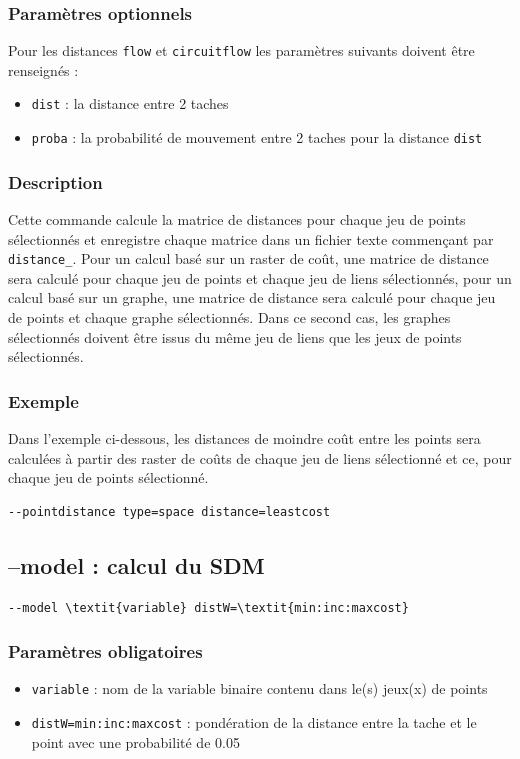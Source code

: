 \documentclass[a4paper,10pt]{report}
\begin{document}
\subsubsection{Paramètres optionnels}
Pour les distances \verb|flow| et \verb|circuitflow| les paramètres suivants doivent être renseignés :
\begin{itemize}
	\item \verb|dist| : la distance entre 2 taches
	\item \verb|proba| : la probabilité de mouvement entre 2 taches pour la distance \verb|dist|
\end{itemize}

\subsubsection{Description}
Cette commande calcule la matrice de distances pour chaque jeu de points sélectionnés et enregistre chaque matrice dans un fichier texte commençant par \verb|distance_|.
Pour un calcul basé sur un raster de coût, une matrice de distance sera calculé pour chaque jeu de points et chaque jeu de liens sélectionnés, pour un calcul basé sur un graphe, une matrice de distance sera calculé pour chaque jeu de points et chaque graphe sélectionnés. Dans ce second cas, les graphes sélectionnés doivent être issus du même jeu de liens que les jeux de points sélectionnés.

\subsubsection{Exemple}
Dans l'exemple ci-dessous, les distances de moindre coût entre les points sera calculées à partir des raster de coûts de chaque jeu de liens sélectionné et ce, pour chaque jeu de points sélectionné.
\begin{Verbatim}
--pointdistance type=space distance=leastcost
\end{Verbatim}

\subsection{--model : calcul du SDM}
\begin{Verbatim}[commandchars=\\\{\}]
--model \textit{variable} distW=\textit{min:inc:maxcost}
\end{Verbatim}

\subsubsection{Paramètres obligatoires}
\begin{itemize}
	\item \verb|variable| : nom de la variable binaire contenu dans le(s) jeux(x) de points
	\item \verb|distW=min:inc:maxcost| : pondération de la distance entre la tache et le point avec une probabilité de 0.05	
\end{itemize}
\end{document}
